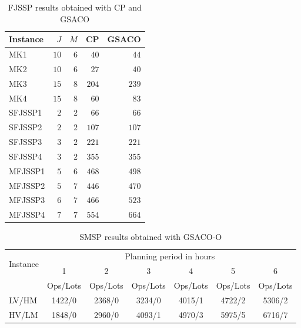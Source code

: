 \begin{table}[t]
	\caption{FJSSP results obtained with CP and GSACO}\label{tab:benchmarkresults} \centering
	\begin{tabular}{|lr|r|r|r|}
		\hline
		Instance & $J$  & $M$ & CP  & GSACO \\ \hline
		MK1      & $10$ & $6$ & $40$  & $44$     \\ 
		MK2      & $10$ & $6$ & $27$  & $40$     \\ 
		MK3      & $15$ & $8$ & $204$ & $239$    \\ 
		MK4      & $15$ & $8$ & $60$  & $83$     \\ 
		SFJSSP1   & $2$ & $2$ & $66$  & $66$     \\ 
		SFJSSP2   & $2$ & $2$ & $107$ & $107$    \\ 
		SFJSSP3   & $3$ & $2$ & $221$ & $221$    \\ 
		SFJSSP4   & $3$ & $2$ & $355$ & $355$    \\ 
		MFJSSP1   & $5$ & $6$ & $468$ & $498$    \\ 
		MFJSSP2   & $5$ & $7$ & $446$ & $470$    \\ 
		MFJSSP3   & $6$ & $7$ & $466$ & $523$    \\ 
		MFJSSP4   & $7$ & $7$ & $554$ & $664$    \\ 
		\hline
	\end{tabular}
\end{table}



\begin{table}[t]
	\caption{SMSP results obtained with GSACO-O}	\label{tab:results-operations} \centering
	\begin{tabular}{|l|cccccc|}
		\hline
		\multicolumn{1}{|c|}{\multirow{2}{*}{Instance}} &
		\multicolumn{6}{c|}{Planning period in hours} \\ \cline{2-7} 
		\multicolumn{1}{|c|}{} &
		\multicolumn{1}{c|}{1} &
		\multicolumn{1}{c|}{2} &
		\multicolumn{1}{c|}{3} &
		\multicolumn{1}{c|}{4} &
		\multicolumn{1}{c|}{5} &
		6 \\ \hline &
		\multicolumn{1}{l|}{Ops/Lots} &
		\multicolumn{1}{l|}{Ops/Lots} &
		\multicolumn{1}{l|}{Ops/Lots} &
		\multicolumn{1}{l|}{Ops/Lots} &
		\multicolumn{1}{c|}{Ops/Lots} &
		\multicolumn{1}{l|}{Ops/Lots} \\ \cline{2-7}
		LV/HM &
		\multicolumn{1}{c|}{1422/0} &
		\multicolumn{1}{c|}{2368/0} &
		\multicolumn{1}{c|}{3234/0} &
		\multicolumn{1}{c|}{4015/1} &
		\multicolumn{1}{c|}{4722/2} &
		5306/2 \\ 
		HV/LM &
		\multicolumn{1}{c|}{1848/0} &
		\multicolumn{1}{c|}{2960/0} &
		\multicolumn{1}{c|}{4093/1} &
		\multicolumn{1}{c|}{4970/3} &
		\multicolumn{1}{c|}{5975/5} &
		6716/7 \\ \hline
	\end{tabular}%
\end{table}



